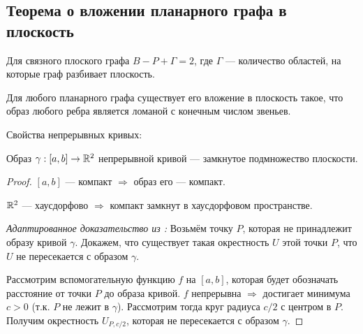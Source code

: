 \subsection{Теорема о вложении планарного графа в плоскость}

\begin{theorem}
    Для связного плоского графа $B - P + \Gamma = 2$, где $\Gamma$ — количество областей, на которые граф разбивает плоскость.
\end{theorem}

\begin{theorem}[$\bigstar$]
    Для любого планарного графа существует его вложение в плоскость такое, что образ любого ребра является ломаной с конечным числом звеньев.
\end{theorem}

Свойства непрерывных кривых:

\begin{lemma}
    Образ $\gamma: [a,b] \to \mathbb{R}^2$ непрерывной кривой — замкнутое подмножество плоскости.
\end{lemma}
\begin{proof}
    $\left[a,b\right]$ — компакт $\Longrightarrow$ образ его — компакт.
    
    $\mathbb{R}^2$ — хаусдорфово $\Longrightarrow$ компакт замкнут в хаусдорфовом пространстве.

    \noindent \textit{Адаптированное доказательство из \cite{oshemkov}:} Возьмём точку $P$, которая не принадлежит образу кривой $\gamma$. Докажем, что существует такая окрестность $U$ этой точки $P$, что $U$ не пересекается с образом $\gamma$.

    Рассмотрим вспомогательную функцию $f$ на $[a,b]$, которая будет обозначать расстояние от точки $P$ до образа кривой. $f$ непрерывна $\Longrightarrow$ достигает минимума $c > 0$ (т.к. $P$ не лежит в $\gamma$). Рассмотрим тогда круг радиуса $c / 2$ с центром в $P$. Получим окрестность $U_{P, c/2}$, которая не пересекается с образом $\gamma$.
\end{proof}


